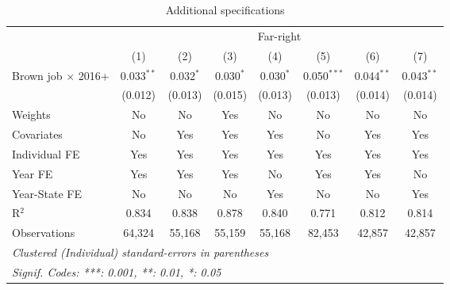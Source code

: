 \begin{table}[htbp]
   \caption{Additional specifications}
   \centering
   \begin{tabular}{lccccccc}
      \tabularnewline \midrule \midrule
       & \multicolumn{7}{c}{Far-right}\\
                                & (1)          & (2)         & (3)         & (4)         & (5)           & (6)          & (7)\\  
      Brown job $\times$ 2016+  & 0.033$^{**}$ & 0.032$^{*}$ & 0.030$^{*}$ & 0.030$^{*}$ & 0.050$^{***}$ & 0.044$^{**}$ & 0.043$^{**}$\\   
                                & (0.012)      & (0.013)     & (0.015)     & (0.013)     & (0.013)       & (0.014)      & (0.014)\\   
      Weights                   & No           & No          & Yes         & No          & No            & No           & No\\  
      Covariates                & No           & Yes         & Yes         & Yes         & No            & Yes          & Yes\\  
      Individual FE             & Yes          & Yes         & Yes         & Yes         & Yes           & Yes          & Yes\\  
      Year FE                   & Yes          & Yes         & Yes         & No          & Yes           & Yes          & No\\  
      Year-State FE             & No           & No          & No          & Yes         & No            & No           & Yes\\  
      R$^2$                     & 0.834        & 0.838       & 0.878       & 0.840       & 0.771         & 0.812        & 0.814\\  
      Observations              & 64,324       & 55,168      & 55,159      & 55,168      & 82,453        & 42,857       & 42,857\\  
      \midrule \midrule
      \multicolumn{8}{l}{\emph{Clustered (Individual) standard-errors in parentheses}}\\
      \multicolumn{8}{l}{\emph{Signif. Codes: ***: 0.001, **: 0.01, *: 0.05}}\\
   \end{tabular}
\end{table}


